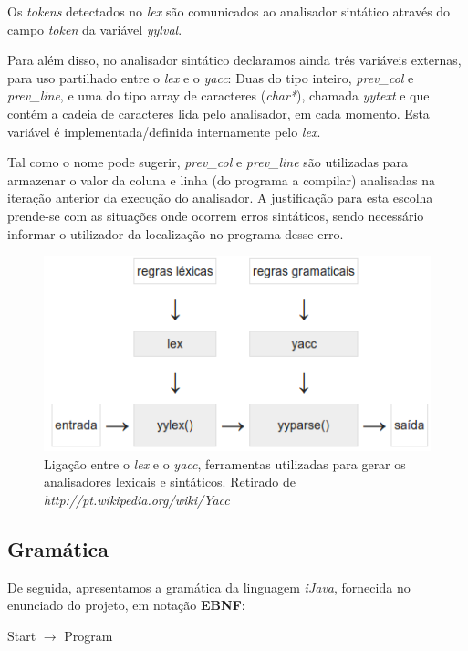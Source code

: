 \documentclass[11pt,a4paper]{article}
\begin{document}
Os \emph{tokens} detectados no \emph{lex} são comunicados ao analisador sintático através do campo \emph{token} da variável \emph{yylval}.

Para além disso, no analisador sintático declaramos ainda três variáveis externas, para uso partilhado entre o \emph{lex} e o \emph{yacc}: Duas do tipo inteiro, \emph{prev\_col} e \emph{prev\_line}, e uma do tipo array de caracteres (\emph{char*}), chamada \emph{yytext} e que contém a cadeia de caracteres lida pelo analisador, em cada momento. Esta variável é implementada/definida internamente pelo \emph{lex}.

Tal como o nome pode sugerir, \emph{prev\_col} e \emph{prev\_line} são utilizadas para armazenar o valor da coluna e linha (do programa a compilar) analisadas na iteração anterior da execução do analisador. A justificação para esta escolha prende-se com as situações onde ocorrem erros sintáticos, sendo necessário informar o utilizador da localização no programa desse erro.

\begin{figure}[H]
  \centering
      \includegraphics[scale=0.5]{DiagramaLExYACC.png}
  \caption{Ligação entre o \emph{lex} e o \emph{yacc}, ferramentas utilizadas para gerar os analisadores lexicais e sintáticos. Retirado de \emph{http://pt.wikipedia.org/wiki/Yacc}}
\end{figure}

\subsection{Gramática}

De seguida, apresentamos a gramática da linguagem \emph{iJava}, fornecida no enunciado do projeto, em notação \textbf{EBNF}:

\vspace{0.5cm}

\hspace{-1cm}Start $\rightarrow$ Program
\end{document}
